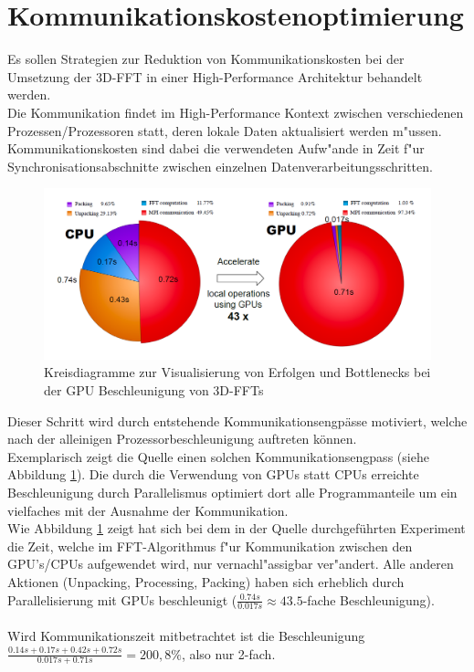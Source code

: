 \section{Kommunikationskostenoptimierung}
Es sollen Strategien zur Reduktion von Kommunikationskosten bei der Umsetzung der 3D-FFT in einer High-Performance Architektur behandelt werden.\\

Die Kommunikation findet im High-Performance Kontext zwischen verschiedenen Prozessen/Prozessoren statt, deren lokale Daten aktualisiert werden m"ussen.\\
Kommunikationskosten sind dabei die verwendeten Aufw"ande in Zeit f"ur Synchronisationsabschnitte zwischen einzelnen Datenverarbeitungsschritten.\\

\begin{figure}
\centering
  \includegraphics[width=\linewidth]{res/speedup.png}
  \caption{\cite[Abb. 3]{mainpaper} Kreisdiagramme zur Visualisierung von Erfolgen und Bottlenecks bei der GPU Beschleunigung von 3D-FFTs}
  \label{fig:speedup}
\end{figure}

Dieser Schritt wird durch entstehende Kommunikationsengpässe motiviert, welche nach der alleinigen Prozessorbeschleunigung auftreten können.\\
Exemplarisch zeigt die Quelle \cite[Abb. 3]{mainpaper} einen solchen Kommunikationsengpass (siehe Abbildung \ref{fig:speedup}).
Die durch die Verwendung von GPUs statt CPUs erreichte Beschleunigung durch Parallelismus optimiert dort alle Programmanteile um ein vielfaches mit der Ausnahme der Kommunikation.\\

Wie Abbildung \ref{fig:speedup} zeigt hat sich bei dem in der Quelle durchgeführten Experiment die Zeit, welche im FFT-Algorithmus f"ur Kommunikation zwischen den GPU's/CPUs aufgewendet wird, nur vernachl"assigbar ver"andert. Alle anderen Aktionen (Unpacking, Processing, Packing) haben sich erheblich durch Parallelisierung mit GPUs beschleunigt ($ \frac{0.74s}{0.017s} \approx 43.5$-fache Beschleunigung).\\
\\
Wird Kommunikationszeit mitbetrachtet ist die Beschleunigung $\frac{0.14s+0.17s+0.42s+0.72s}{0.017s+0.71s}=200,8\%$, also nur 2-fach.

